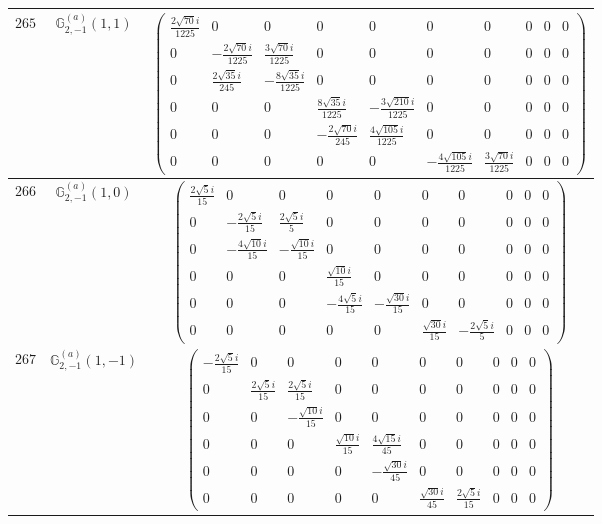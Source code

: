 \documentclass[fleqn,8pt,landscape]{jsarticle}
\begin{document}
\begin{center}
\begin{longtable}{ccc}
$ 265 $ & $ \mathbb{G}_{2,-1}^{(a)}(1,1) $ & $ \begin{pmatrix} \frac{2 \sqrt{70} i}{1225} & 0 & 0 & 0 & 0 & 0 & 0 & 0 & 0 & 0 \\ 0 & - \frac{2 \sqrt{70} i}{1225} & \frac{3 \sqrt{70} i}{1225} & 0 & 0 & 0 & 0 & 0 & 0 & 0 \\ 0 & \frac{2 \sqrt{35} i}{245} & - \frac{8 \sqrt{35} i}{1225} & 0 & 0 & 0 & 0 & 0 & 0 & 0 \\ 0 & 0 & 0 & \frac{8 \sqrt{35} i}{1225} & - \frac{3 \sqrt{210} i}{1225} & 0 & 0 & 0 & 0 & 0 \\ 0 & 0 & 0 & - \frac{2 \sqrt{70} i}{245} & \frac{4 \sqrt{105} i}{1225} & 0 & 0 & 0 & 0 & 0 \\ 0 & 0 & 0 & 0 & 0 & - \frac{4 \sqrt{105} i}{1225} & \frac{3 \sqrt{70} i}{1225} & 0 & 0 & 0 \end{pmatrix} $ \\ \hline
$ 266 $ & $ \mathbb{G}_{2,-1}^{(a)}(1,0) $ & $ \begin{pmatrix} \frac{2 \sqrt{5} i}{15} & 0 & 0 & 0 & 0 & 0 & 0 & 0 & 0 & 0 \\ 0 & - \frac{2 \sqrt{5} i}{15} & \frac{2 \sqrt{5} i}{5} & 0 & 0 & 0 & 0 & 0 & 0 & 0 \\ 0 & - \frac{4 \sqrt{10} i}{15} & - \frac{\sqrt{10} i}{15} & 0 & 0 & 0 & 0 & 0 & 0 & 0 \\ 0 & 0 & 0 & \frac{\sqrt{10} i}{15} & 0 & 0 & 0 & 0 & 0 & 0 \\ 0 & 0 & 0 & - \frac{4 \sqrt{5} i}{15} & - \frac{\sqrt{30} i}{15} & 0 & 0 & 0 & 0 & 0 \\ 0 & 0 & 0 & 0 & 0 & \frac{\sqrt{30} i}{15} & - \frac{2 \sqrt{5} i}{5} & 0 & 0 & 0 \end{pmatrix} $ \\ \hline
$ 267 $ & $ \mathbb{G}_{2,-1}^{(a)}(1,-1) $ & $ \begin{pmatrix} - \frac{2 \sqrt{5} i}{15} & 0 & 0 & 0 & 0 & 0 & 0 & 0 & 0 & 0 \\ 0 & \frac{2 \sqrt{5} i}{15} & \frac{2 \sqrt{5} i}{15} & 0 & 0 & 0 & 0 & 0 & 0 & 0 \\ 0 & 0 & - \frac{\sqrt{10} i}{15} & 0 & 0 & 0 & 0 & 0 & 0 & 0 \\ 0 & 0 & 0 & \frac{\sqrt{10} i}{15} & \frac{4 \sqrt{15} i}{45} & 0 & 0 & 0 & 0 & 0 \\ 0 & 0 & 0 & 0 & - \frac{\sqrt{30} i}{45} & 0 & 0 & 0 & 0 & 0 \\ 0 & 0 & 0 & 0 & 0 & \frac{\sqrt{30} i}{45} & \frac{2 \sqrt{5} i}{15} & 0 & 0 & 0 \end{pmatrix} $ \\ \hline

\end{longtable}
\end{center}
\end{document}
